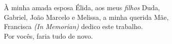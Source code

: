 \documentclass[tcc]{ic}
\begin{document}

\capa

 \newpage
 \thispagestyle{empty}
 \mbox{}\vfill
 \begin{flushright}
 À minha amada esposa Élida, aos meus \emph{filhos} Duda, \\
 Gabriel, João Marcelo e Melissa, a minha querida Mãe,\\
 Francisca \textit{(In Memorian)} dedico este trabalho. \\
 Por vocês, faria tudo de novo.
 \end{flushright}

\end{document}
